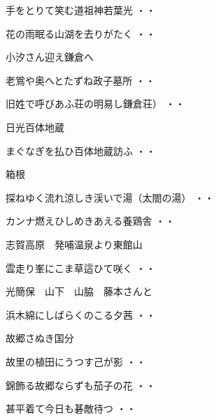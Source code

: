 \begin{shiika}手をとりて笑む道祖神若葉光
\hfill{・・}\end{shiika}
\begin{shiika}花の雨眠る山湖を去りがたく
\hfill{・・}\end{shiika}
\vspace{0.6cm}
小汐さん迎え鎌倉へ
\begin{shiika}老鴬や奥へとたずね政子墓所
\hfill{・・}\end{shiika}
\vspace{0.6cm}
\begin{shiika}旧姓で呼びあふ荘の明易し鎌倉荘）
\hfill{・・}\end{shiika}
\vspace{0.6cm}
日光百体地蔵
\begin{shiika}まぐなぎを払ひ百体地蔵訪ふ
\hfill{・・}\end{shiika}
\vspace{0.6cm}
箱根
\begin{shiika}探ねゆく流れ涼しき渓いで湯（太閤の湯）
\hfill{・・}\end{shiika}
\begin{shiika}カンナ燃えひしめきあえる養鶏舎
\hfill{・・}\end{shiika}
\vspace{0.6cm}
志賀高原　発哺温泉より東館山
\begin{shiika}雲走り峯にこま草這ひて咲く
\hfill{・・}\end{shiika}
\vspace{0.6cm}
光簡保　山下　山脇　藤本さんと
\begin{shiika}浜木綿にしばらくのこる夕茜
\hfill{・・}\end{shiika}
\vspace{0.6cm}
故郷さぬき国分
\begin{shiika}故里の植田にうつす己が影
\hfill{・・}\end{shiika}
\begin{shiika}錦飾る故郷ならずも茄子の花
\hfill{・・}\end{shiika}
\begin{shiika}甚平着て今日も碁敵待つ
\hfill{・・}\end{shiika}

